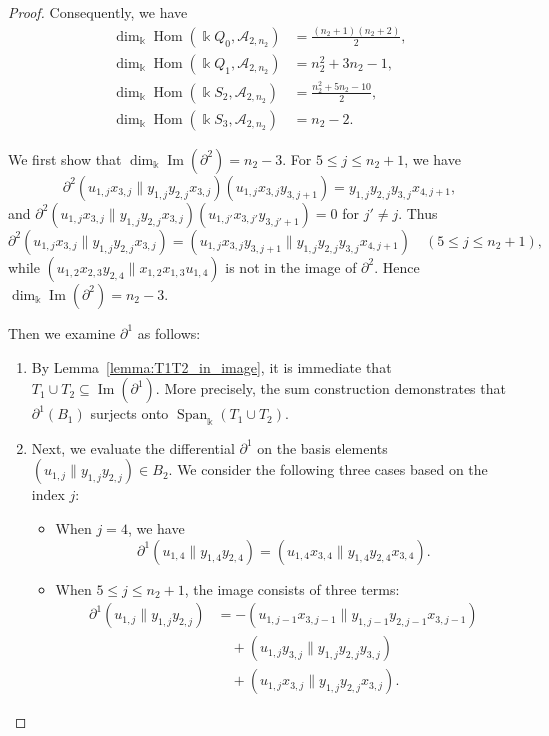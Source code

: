 \documentclass[a4paper, reqno, 11pt]{amsart}
\theoremstyle{definition}
\begin{document}
\begin{proof}
	Consequently, we have
	\allowdisplaybreaks
	\begin{align*}
		\dim_{\Bbbk} \operatorname{Hom}(\Bbbk Q_0,  \mathcal{A}_{2, n_2}) &= \frac{(n_2+1)(n_2+2)}{2},\\
		\dim_{\Bbbk} \operatorname{Hom}(\Bbbk Q_1,  \mathcal{A}_{2, n_2}) &= n_2^2+3n_2-1,\\
		\dim_{\Bbbk} \operatorname{Hom}(\Bbbk S_2,  \mathcal{A}_{2, n_2}) &= \frac{n_2^2+5n_2-10}{2},\\
		\dim_{\Bbbk} \operatorname{Hom}(\Bbbk S_3, \mathcal{A}_{2,n_2}) &= n_2-2.
	\end{align*}
	
	We first show that $\dim_{\Bbbk} \operatorname{Im}(\partial^2) = n_2-3$. For $5 \le j \le n_2+1$, we have
	\[
	\partial^2(u_{1,j}x_{3,j} \parallel y_{1,j}y_{2,j}x_{3,j})(u_{1,j}x_{3,j}y_{3,j+1}) = y_{1,j}y_{2,j}y_{3,j}x_{4,j+1},
	\]
	and $\partial^2(u_{1,j}x_{3,j} \parallel y_{1,j}y_{2,j}x_{3,j})(u_{1,j'}x_{3,j'}y_{3,j'+1}) = 0$ for $j' \neq j$. 
	Thus
	\[
	\partial^2(u_{1,j}x_{3,j} \parallel y_{1,j}y_{2,j}x_{3,j}) = (u_{1,j}x_{3,j}y_{3,j+1} \parallel y_{1,j}y_{2,j}y_{3,j}x_{4,j+1}) \quad (5 \le j \le n_2+1),
	\]
	while $(u_{1,2}x_{2,3}y_{2,4} \parallel x_{1,2}x_{1,3}u_{1,4})$ is not in the image of $\partial^2$. Hence $\dim_{\Bbbk} \operatorname{Im}(\partial^2) = n_2-3$.
	
	Then we examine $\partial^1$ as follows:
	\begin{enumerate}[leftmargin=*, itemindent=0pt, labelindent=0pt, labelsep=0.5em]
		\item By Lemma~\ref{lemma:T1T2_in_image}, it is immediate that $T_1\cup T_2 \subseteq \operatorname{Im}(\partial^1)$. More precisely, the sum construction demonstrates that $\partial^1(B_1)$ surjects onto $\operatorname{Span}_\Bbbk(T_1 \cup T_2)$.
		
		\item Next, we evaluate the differential $\partial^1$ on the basis elements $(u_{1,j} \parallel y_{1,j}y_{2,j}) \in B_2$. We consider the following three cases based on the index $j$:
		
		\begin{itemize}[label=--]
			\item When $j = 4$, we have
			\[
			\partial^1(u_{1,4} \parallel y_{1,4}y_{2,4}) = (u_{1,4}x_{3,4} \parallel y_{1,4}y_{2,4}x_{3,4}).
			\]
			
			\item  When $5 \le j \le n_2+1$, the image consists of three terms:
			\[
			\begin{aligned}
				\partial^1(u_{1,j} \parallel y_{1,j}y_{2,j}) &= - (u_{1,j-1}x_{3,j-1} \parallel y_{1,j-1}y_{2,j-1}x_{3,j-1}) \\
				&\quad + (u_{1,j}y_{3,j} \parallel y_{1,j}y_{2,j}y_{3,j}) \\
				&\quad + (u_{1,j}x_{3,j} \parallel y_{1,j}y_{2,j}x_{3,j}).
			\end{aligned}
			\]
			

\end{itemize}
\end{enumerate}
\end{proof}
\end{document}
